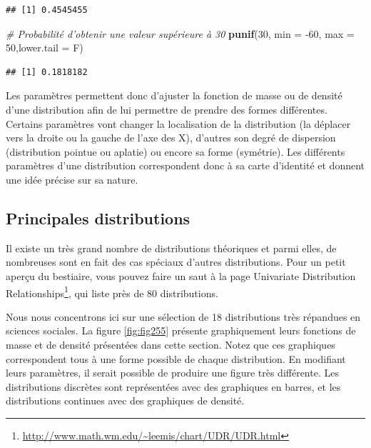 \documentclass[
  11pt,
  french,
]{book}
\makeatletter
\newenvironment{Shaded}{\begin{snugshade}}{\end{snugshade}}
\newcommand{\CommentTok}[1]{\textcolor[rgb]{0.56,0.35,0.01}{\textit{#1}}}
\newcommand{\DataTypeTok}[1]{\textcolor[rgb]{0.13,0.29,0.53}{#1}}
\newcommand{\DecValTok}[1]{\textcolor[rgb]{0.00,0.00,0.81}{#1}}
\newcommand{\KeywordTok}[1]{\textcolor[rgb]{0.13,0.29,0.53}{\textbf{#1}}}
\newcommand{\NormalTok}[1]{#1}
\renewcommand{\href}[2]{#2\footnote{\url{#1}}}
\newenvironment{kframe}{%
\medskip{}
\setlength{\fboxsep}{.8em}
 \def\at@end@of@kframe{}%
 \ifinner\ifhmode%
  \def\at@end@of@kframe{\end{minipage}}%
  \begin{minipage}{\columnwidth}%
 \fi\fi%
 \def\FrameCommand##1{\hskip\@totalleftmargin \hskip-\fboxsep
 \colorbox{shadecolor}{##1}\hskip-\fboxsep
     \hskip-\linewidth \hskip-\@totalleftmargin \hskip\columnwidth}%
 \MakeFramed {\advance\hsize-\width
   \@totalleftmargin\z@ \linewidth\hsize
   \@setminipage}}%
 {\par\unskip\endMakeFramed%
 \at@end@of@kframe}
\renewenvironment{Shaded}{\begin{kframe}}{\end{kframe}}
\makeatother
\begin{document}
\begin{verbatim}
## [1] 0.4545455
\end{verbatim}

\begin{Shaded}
\begin{Highlighting}[]
\CommentTok{# Probabilité d'obtenir une valeur supérieure à 30}
\KeywordTok{punif}\NormalTok{(}\DecValTok{30}\NormalTok{, }\DataTypeTok{min =} \DecValTok{-60}\NormalTok{, }\DataTypeTok{max =} \DecValTok{50}\NormalTok{,}\DataTypeTok{lower.tail =}\NormalTok{ F)}
\end{Highlighting}
\end{Shaded}

\begin{verbatim}
## [1] 0.1818182
\end{verbatim}

Les paramètres permettent donc d'ajuster la fonction de masse ou de densité d'une distribution afin de lui permettre de prendre des formes différentes. Certains paramètres vont changer la localisation de la distribution (la déplacer vers la droite ou la gauche de l'axe des X), d'autres son degré de dispersion (distribution pointue ou aplatie) ou encore sa forme (symétrie). Les différents paramètres d'une distribution correspondent donc à sa carte d'identité et donnent une idée précise sur sa nature.

\hypertarget{principales-distributions}{%
\subsection{Principales distributions}\label{principales-distributions}}

Il existe un très grand nombre de distributions théoriques et parmi elles, de nombreuses sont en fait des cas spéciaux d'autres distributions. Pour un petit aperçu du bestiaire, vous pouvez faire un saut à la page \href{http://www.math.wm.edu/~leemis/chart/UDR/UDR.html}{Univariate Distribution Relationships}, qui liste près de 80 distributions.

Nous nous concentrons ici sur une sélection de 18 distributions très répandues en sciences sociales. La figure \ref{fig:fig255} présente graphiquement leurs fonctions de masse et de densité présentées dans cette section. Notez que ces graphiques correspondent tous à une forme possible de chaque distribution. En modifiant leurs paramètres, il serait possible de produire une figure très différente. Les distributions discrètes sont représentées avec des graphiques en barres, et les distributions continues avec des graphiques de densité.
\end{document}
